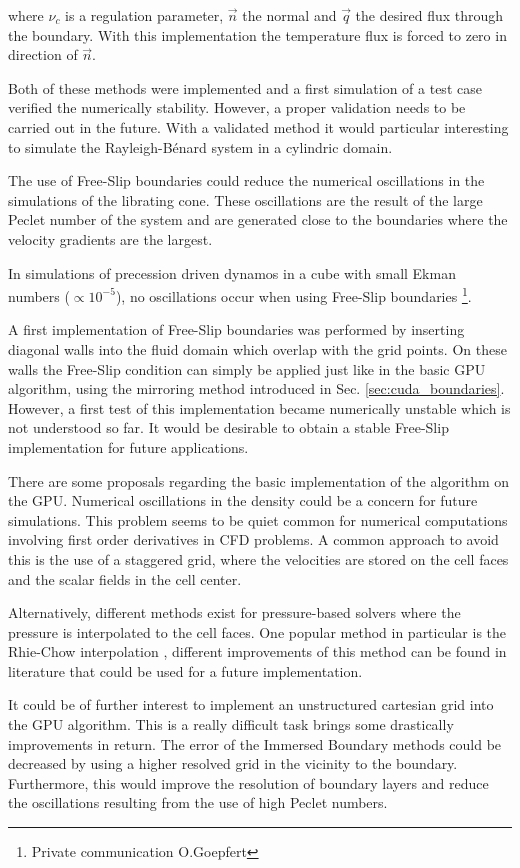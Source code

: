 where $\nu_c$ is a regulation parameter, $\vec{n}$ the normal and $\vec{q}$  the desired flux through the boundary.
With this implementation the temperature flux is forced to zero in direction of $\vec{n}$.

Both of these methods were implemented and a first simulation of a test case verified the numerically stability.
However, a proper validation needs to be carried out in the future.
With a validated method it would  particular interesting to simulate
the Rayleigh-B\'{e}nard system in a cylindric domain.


The use of Free-Slip boundaries could reduce the numerical oscillations in the simulations of the librating cone.
These oscillations are the result of the large Peclet number of the system and are generated
close to the boundaries where the velocity gradients are the largest.

In simulations of precession driven dynamos in a cube with small Ekman numbers ($\propto 10^{-5}$),
no oscillations occur when using Free-Slip boundaries \footnote{Private communication O.Goepfert}.

A first implementation of Free-Slip boundaries was performed
by inserting diagonal walls into the fluid domain which overlap with the grid points.
On these walls the Free-Slip condition can simply be applied just like in the basic GPU algorithm,
using the mirroring method introduced in Sec. \ref{sec:cuda_boundaries}.
However, a first test of this implementation became numerically unstable which is not understood so far.
It would be desirable to obtain a stable Free-Slip implementation for future applications.

There are some proposals regarding the basic implementation of the algorithm on the GPU.
Numerical oscillations in the density could be a concern for future simulations.
This problem seems to be quiet common for numerical computations involving first order derivatives in CFD problems.
A common approach to avoid this is the use of a staggered grid, where the velocities
are stored on the cell faces and the scalar fields in the cell center.

Alternatively, different methods exist for pressure-based solvers where the pressure is interpolated to the cell faces.
One popular method in particular is the Rhie-Chow interpolation \citep{Rhie1983},
different improvements of this method can be found in literature that could be used for a future implementation.

It could be of further interest to implement an unstructured cartesian grid into the GPU algorithm.
This is a really difficult task brings some drastically improvements in return.
The error of the Immersed Boundary methods could be decreased by using a higher resolved grid in the vicinity to the boundary.
Furthermore, this would improve the resolution of boundary layers  and reduce the oscillations resulting from the use of high Peclet numbers.

